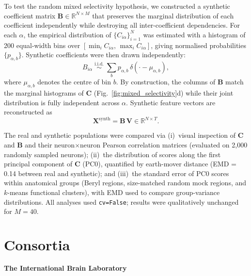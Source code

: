 \documentclass[10pt,lineno]{elife}
\begin{document}
  To test the random mixed selectivity hypothesis, we constructed a
  synthetic coefficient matrix $\mathbf{B} \in \mathbb{R}^{N \times M}$
  that preserves the marginal distribution of each coefficient
  independently while destroying all inter-coefficient dependencies.
  For each $\alpha$, the empirical distribution of
  $\{C_{i\alpha}\}_{i=1}^{N}$ was estimated with a histogram of 200 equal-width
  bins over $[\min_i C_{i\alpha},\, \max_i C_{i\alpha}]$, giving
  normalised probabilities $\{p_{\alpha,b}\}$. Synthetic coefficients
  were then drawn independently:
  \begin{equation}
      B_{i\alpha} \;\overset{\text{i.i.d.}}{\sim}\;
      \sum_{b} p_{\alpha,b}\,\delta(\cdot - \mu_{\alpha,b}),
  \end{equation}
  where $\mu_{\alpha,b}$ denotes the centre of bin $b$. By construction,
  the columns of $\mathbf{B}$ match the marginal histograms of $\mathbf{C}$
  (Fig.~\ref{fig:mixed_selectivity}d) while their joint distribution is fully independent across
  $\alpha$. Synthetic feature vectors are reconstructed as
  \begin{equation}
      \mathbf{X}^{\mathrm{synth}} = \mathbf{B}\,\mathbf{V}
      \in \mathbb{R}^{N \times T}.
  \end{equation}

  The real and synthetic populations were compared via (i)~visual
  inspection of $\mathbf{C}$ and $\mathbf{B}$ and their neuron$\times$neuron
  Pearson correlation matrices (evaluated on 2{,}000 randomly sampled
  neurons); (ii)~the distribution of scores along the first principal
  component of $\mathbf{C}$ (PC0), quantified by earth-mover distance
  (EMD = 0.14 between real and synthetic); and (iii)~the standard error
  of PC0 scores within anatomical groups (Beryl regions, size-matched
  random mock regions, and $k$-means functional clusters), with EMD used
  to compare group-variance distributions.
  All analyses used \texttt{cv=False}; results were qualitatively
  unchanged for $M = 40$.
\fi


\section{Consortia}
\textbf{The International Brain Laboratory}
\end{document}
